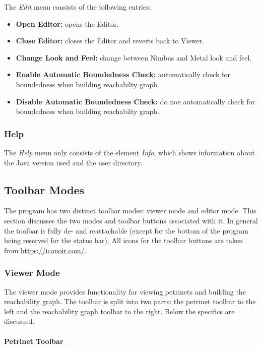 \documentclass[10pt, a4paper]{article}
\begin{document}
The \textit{Edit} menu consists of the following entries:


\begin{itemize}
\item \textbf{Open Editor:} opens the Editor.
\item \textbf{Close Editor:} closes the Editor and reverts back to Viewer.
\item \textbf{Change Look and Feel:} change between Nimbus and Metal look and feel.
\item \textbf{Enable Automatic Boundedness Check:} automatically check for boundedness when building reachabilty graph.
\item \textbf{Disable Automatic Boundedness Check:} do noe automatically check for boundedness when building reachabilty graph.
\end{itemize}

\subsubsection{Help}

The \textit{Help} menu only consists of the element \textit{Info}, which shows information about the Java version used and the user directory.

\subsection{Toolbar Modes}
\label{label:modes}
The program has two distinct toolbar modes: viewer mode and editor mode. This section discusses the two modes and toolbar buttons associated with it. In general the toolbar is fully de- and reattachable (except for the bottom of the program being reserved for the status bar). All icons for the toolbar buttons are taken from \url{https://iconoir.com/}.

\subsubsection{Viewer Mode}

The viewer mode provides functionality for viewing petrinets and building the reachability graph. The toolbar is split into two parts: the petrinet toolbar to the left and the reachability graph toolbar to the right. Below the specifics are discussed.

\paragraph{Petrinet Toolbar}
\end{document}
